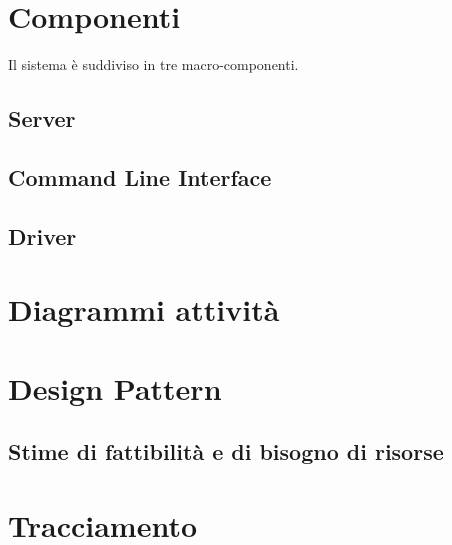 \documentclass{scalatekids-article}
\begin{document}
\section{Componenti}

Il sistema è suddiviso in tre macro-componenti.

\subsection{Server}

\subsection{Command Line Interface}

\subsection{Driver}

\section{Diagrammi attività}

\section{Design Pattern}

\subsection{Stime di fattibilità e di bisogno di risorse}

\section{Tracciamento}
\end{document}
